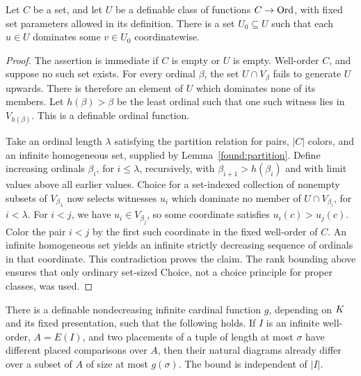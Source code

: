 \begin{lemma}
\label{lev:ordinal-vectors}
Let \(C\) be a set, and let \(U\) be a definable class of functions
\(C\to\operatorname{Ord}\), with fixed set parameters allowed in its definition.
There is a set \(U_0\subseteq U\) such that each \(u\in U\)
dominates some \(v\in U_0\) coordinatewise.
\end{lemma}

\begin{proof}
The assertion is immediate if \(C\) is empty or \(U\) is empty.
Well-order \(C\), and suppose no such set exists. For every
ordinal \(\beta\), the set \(U\cap V_\beta\) fails to generate
\(U\) upwards. There is therefore an element of \(U\) which
dominates none of its members. Let \(h(\beta)>\beta\) be the
least ordinal such that one such witness lies in \(V_{h(\beta)}\).
This is a definable ordinal function.

Take an ordinal length \(\lambda\) satisfying the partition
relation for pairs, \(|C|\) colors, and an infinite homogeneous
set, supplied by Lemma~\ref{found:partition}. Define increasing
ordinals \(\beta_i\), for \(i\le\lambda\), recursively, with
\(\beta_{i+1}>h(\beta_i)\) and with limit values above all earlier
values. Choice for a set-indexed collection of nonempty subsets
of \(V_{\beta_\lambda}\) now selects witnesses \(u_i\) which
dominate no member of \(U\cap V_{\beta_i}\), for \(i<\lambda\).
For \(i<j\), we have \(u_i\in V_{\beta_j}\), so some coordinate
satisfies \(u_i(c)>u_j(c)\). Color the pair \(i<j\) by the first
such coordinate in the fixed well-order of \(C\). An infinite
homogeneous set yields an infinite strictly decreasing sequence
of ordinals in that coordinate. This contradiction proves the
claim. The rank bounding above ensures that only ordinary
set-sized Choice, not a choice principle for proper classes,
was used.
\end{proof}

\begin{proposition}
\label{lev:testing}
There is a definable nondecreasing infinite cardinal function
\(g\), depending on \(K\) and its fixed presentation, such that
the following holds. If \(I\) is an infinite well-order, \(A=E(I)\), and
two placements of a tuple of length at most \(\sigma\) have
different placed comparisons over \(A\), then their natural
diagrams already differ over a subset of \(A\) of size at most
\(g(\sigma)\). The bound is independent of \(|I|\).
\end{proposition}

